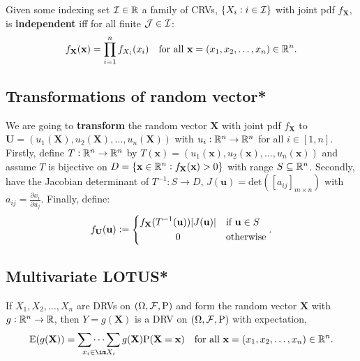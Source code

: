 \documentclass[../Year1.tex]{subfiles}
\begin{document}
\begingroup\belowdisplayskip=-10pt
\begin{definition}
    Given some indexing set $\mathcal{I}\in\mathbb{R}$ a family of CRVs, $\{X_i:i\in\mathcal{I}\}$ with joint pdf $f_\textbf{X}$, is \textbf{independent} iff for all finite $\mathcal{J}\in\mathcal{I}$: \[
        f_{\textbf{X}}(\textbf{x}) = \prod_{i=1}^nf_{X_i}(x_i) \quad \text{\textcolor{black}{for all }$\textbf{x}=(x_1,x_2,\ldots,x_n)\in\mathbb{R}^n$}
    \textcolor{black}{.}\]
\end{definition}
\endgroup

\subsection{Transformations of random vector*}
\begin{definition}[Transformation]
    We are going to \textbf{transform} the random vector $\textbf{X}$ with joint pdf $f_\textbf{X}$ to $\textbf{U}=(u_1(\textbf{X}),u_2(\textbf{X}),\ldots,u_n(\textbf{X}))$ with $u_i: \mathbb{R}^n \rightarrow \mathbb{R}^n$ for all $i\in[1,n]$. Firstly, define $T:\mathbb{R}^n\rightarrow\mathbb{R}^n$ by $T(\textbf{x})=(u_1(\textbf{x}),u_2(\textbf{x}),\ldots,u_n(\textbf{x}))$ and assume $T$ is bijective on $D=\{\textbf{x}\in\mathbb{R}^n:f_\textbf{X}(\textbf{x})>0\}$ with range $S\subseteq\mathbb{R}^n$. Secondly, have the Jacobian determinant of $T^{-1}:S\rightarrow D$, $J(\textbf{u})=\text{det}([a_{ij}]_{m\times n})$ with $a_{ij}=\frac{\partial x_i}{\partial u_j}$. Finally, define: \[
        f_\textbf{U}(\textbf{u}) := \begin{dcases}
            f_\textbf{X}(T^{-1}(\textbf{u}))|J(\textbf{u})| & \text{\textcolor{black}{if }$\textbf{u}\in S$} \\
            \omit\hfil0\hfil & \text{\textcolor{black}{otherwise}}
        \end{dcases}\textcolor{black}{.}
    \]
\end{definition}
\subsection{Multivariate LOTUS*}
\begingroup\belowdisplayskip=-10pt
\begin{theorem}
    If $X_1,X_2,\ldots,X_n$ are DRVs on $(\Omega,\mathcal{F},\mathrm{P})$ and form the random vector $\textbf{X}$ with $g:\mathbb{R}^n\rightarrow\mathbb{R}$, then $Y=g(\textbf{X})$ is a DRV on $(\Omega,\mathcal{F},\mathrm{P})$ with expectation, \[
    \E(g(\textbf{X}))=\mathop{\sum\dots\sum}_{x_i\in\im X_i}g(\textbf{X})\P(\textbf{X}=\textbf{x})
    \quad \text{\textcolor{black}{for all }$\textbf{x}=(x_1,x_2,\ldots,x_n)\in\RR^n$}
    \textcolor{black}{.}
    \]
\end{theorem}
\end{document}
